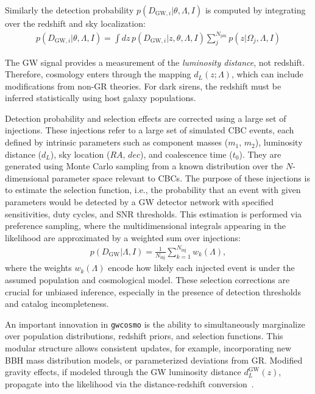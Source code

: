 Similarly the detection probability $p(D_{\mathrm{GW},i} |\theta, \Lambda, I)$ is computed by integrating over the redshift and sky localization:
\begin{align}
    p(D_{\mathrm{GW},i} | \theta, \Lambda, I) = \int dz\, p(D_{\mathrm{GW},i} | z, \theta, \Lambda, I) \sum_{j}^{N_{\mathrm{pix}}} p(z | \Omega_j,\Lambda, I)
\end{align}

The GW signal provides a measurement of the \textit{luminosity distance}, not redshift. Therefore, cosmology enters through the mapping $d_L(z; \Lambda)$, which can include modifications from non-GR theories. For dark sirens, the redshift must be inferred statistically using host galaxy populations.

Detection probability and selection effects are corrected using a large set of injections. These injections refer to a large set of simulated \ac{CBC} events, each defined by intrinsic parameters such as component masses ($m_1$, $m_2$), luminosity distance ($d_L$), sky location ($RA$, $dec$), and coalescence time ($t_0$). They are generated using Monte Carlo sampling from a known distribution over the $N$-dimensional parameter space relevant to \acp{CBC}. The purpose of these injections is to estimate the selection function, i.e., the probability that an event with given parameters would be detected by a \ac{GW} detector network with specified sensitivities, duty cycles, and \ac{SNR} thresholds. This estimation is performed via preference sampling, where the multidimensional integrals appearing in the likelihood are approximated by a weighted sum over injections:
\begin{align}
    p(D_\mathrm{GW} | \Lambda, I) = \frac{1}{N_{\mathrm{inj}}} \sum_{k=1}^{N_{\mathrm{inj}}} w_k(\Lambda),
\end{align}
where the weights $w_k(\Lambda)$ encode how likely each injected event is under the assumed population and cosmological model. These selection corrections are crucial for unbiased inference, especially in the presence of detection thresholds and catalog incompleteness.

An important innovation in \texttt{gwcosmo} is the ability to simultaneously marginalize over population distributions, redshift priors, and selection functions. This modular structure allows consistent updates, for example, incorporating new \ac{BBH} mass distribution models, or parameterized deviations from \ac{GR}. Modified gravity effects, if modeled through the GW luminosity distance $d_L^{\mathrm{GW}}(z)$, propagate into the likelihood via the distance-redshift conversion~\citep{chen2024testing}.

